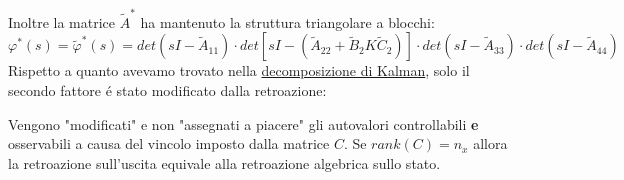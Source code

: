 \documentclass[../main.tex]{subfiles}
\begin{document}
		Inoltre la matrice $ \tilde A^{*} $ ha mantenuto la struttura triangolare a blocchi:
		\[
			\varphi^{*}(s) = \tilde \varphi^{*}(s) = det(sI-\tilde A_{11}) \cdot det[sI-(\tilde A_{22} + \tilde B_2 K \tilde C_2)] \cdot det(sI-\tilde A_{33}) \cdot det(sI-\tilde A_{44})
		\]
		Rispetto a quanto avevamo trovato nella \hyperref[sec:decomp_kalmann_polinomio]{decomposizione di Kalman}, solo il secondo fattore \'e stato modificato dalla retroazione:
		\begin{center}
		\end{center}
		Vengono "modificati" e non "assegnati a piacere" gli autovalori controllabili \textbf{e} osservabili a causa del vincolo imposto dalla matrice $ C $. Se $ rank(C) = n_x $ allora la retroazione sull'uscita equivale alla retroazione algebrica sullo stato.
		
\end{document}
